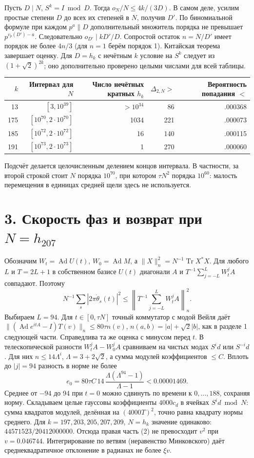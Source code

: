 \documentclass[11pt,a4paper]{article}
\newcommand{\Tr}{\operatorname{Tr}}
\newcommand{\sect}[1]{\section*{\sffamily\color{ink}#1}}
\begin{document}
Пусть $D\mid N$, $S^k=I\bmod D$. Тогда $o_N/N\le4k/(3D)$. В самом деле, усилим простые степени $D$ до всех их степеней в $N$, получив $D'$. По биномиальной формуле при каждом $p^a\parallel D$ дополнительный множитель порядка не превышает $p^{v_p(D')-a}$. Следовательно $o_{D'}\mid kD'/D$. Сопростой остаток $n=N/D'$ имеет порядок не более $4n/3$ (для $n=1$ берём порядок 1). Китайская теорема завершает оценку. Для $D=h_k$ с нечётным $k$ условие на $S^k$ следует из $(1+\sqrt2)^{2k}$; оно дополнительно проверено целыми числами для всей таблицы.
\begin{center}\small\begin{tabular}{@{}rrrrr@{}}\toprule
$k$ & Интервал для $N$ & Число нечётных кратных $h_k$ & $\Delta_{2,N}>$ & Вероятность попадания $<$\\\midrule
13 & $[3,10^{39}]$ & $>10^{34}$ & 86 & .000368\\
175 & $[10^{70},2\cdot10^{70}]$ & 1034 & 221 & .000073\\
185 & $[10^{72},2\cdot10^{72}]$ & 16 & 140 & .000115\\
191 & $[10^{73},2\cdot10^{73}]$ & 1 & 270 & .000060\\\bottomrule\end{tabular}\end{center}
Подсчёт делается целочисленным делением концов интервала. В частности, за второй строкой стоит $N$ порядка $10^{70}$, при котором $\tau N^2$ порядка $10^{60}$: малость перемещения в единицах средней щели здесь не используется.
\newpage
\sect{3. Скорость фаз и возврат при $N=h_{207}$}
Обозначим $W_t=\operatorname{Ad}U(t)$, $W_0=\operatorname{Ad}M$, а $\|X\|_n^2=N^{-1}\Tr X^*X$. Для любого $L$ и $T=2L+1$ в собственном базисе $U(t)$ диагонали $A$ и $T^{-1}\sum_{j=-L}^LW_t^jA$ совпадают. Поэтому
\[
 N^{-1}\sum_s|2\pi\dot\theta_s(t)|^2
 \le\left\|T^{-1}\sum_{j=-L}^LW_t^jA\right\|_n^2 .                       \tag{2}
\]
Выбираем $L=94$. Для $t\in[0,\tau N]$ точный коммутатор с модой Вейля даёт
$\|(\operatorname{Ad}e^{itA}-I)T(v)\|_n\le80\tau n(v)$, $n(a,b)=|a|+\sqrt2|b|$, как в разделе 1 следующей части. Справедлива та же оценка с минусом перед $t$. В телескопической разности $W_t^j A-W_0^jA$ сравниваем на чистых модах $S^i d$ или $S^{-i}d$. Для них $n\le14\Lambda^i$, $\Lambda=3+2\sqrt2$, а сумма модулей коэффициентов $\le C$. Вплоть до $|j|=94$ разность в норме не более
\[
 e_0=80\tau C\,14\,\frac{\Lambda(\Lambda^{94}-1)}{\Lambda-1}<0.00001469 .
\]
Среднее от $-94$ до 94 при $t=0$ можно сдвинуть по времени к $0,\ldots,188$, сохраняя норму. Складываем целые гауссовы коэффициенты $4000c_d$ в ячейках $S^id\bmod N$: сумма квадратов модулей, делённая на $(4000T)^2$, точно равна квадрату нормы среднего. Для $k=197,203,205,207,209$, $N=h_k$ значение одинаково: $44571523/20412000000$. Отсюда правая часть (2) не превосходит $v^2$ при $v=0.046744$. Интегрирование по ветвям (неравенство Минковского) даёт среднеквадратичное отклонение в радианах не более $\xi v$.
\end{document}
